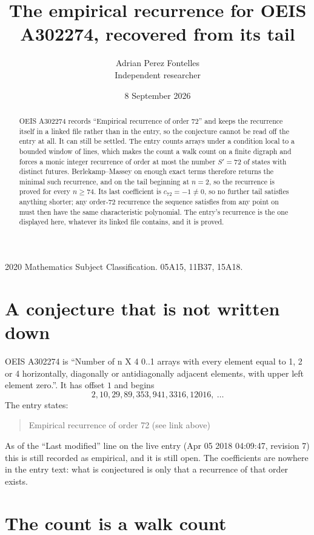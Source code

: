 \documentclass[11pt,a4paper]{article}
\title{The empirical recurrence for OEIS A302274, recovered from its tail}
\author{Adrian Perez Fontelles\\ \small Independent researcher}
\date{8 September 2026}
\theoremstyle{plain}
\theoremstyle{definition}
\begin{document}
\maketitle

\begin{abstract}
OEIS A302274 records ``Empirical recurrence of order $72$'' and keeps the recurrence itself in
a linked file rather than in the entry, so the conjecture cannot be read off the entry at all.
It can still be settled. The entry counts arrays under a condition local to a bounded window of
lines, which makes the count a walk count on a finite digraph and forces a monic integer
recurrence of order at most the number $S'=72$ of states with distinct futures. Berlekamp--Massey on
enough exact terms therefore returns the minimal such recurrence, and on the tail beginning at $n=2$, so the recurrence is proved for every $n\ge74$.
Its last coefficient is $c_{72}=-1\neq0$, so no further tail satisfies anything
shorter; any order-$72$ recurrence the sequence satisfies from any point on must then have
the same characteristic polynomial. The entry's recurrence is the one displayed here, whatever
its linked file contains, and it is proved.
\end{abstract}

\noindent\small 2020 Mathematics Subject Classification. 05A15, 11B37, 15A18.\normalsize

\section{A conjecture that is not written down}

OEIS A302274 is ``Number of n X 4 0..1 arrays with every element equal to 1, 2 or 4 horizontally, diagonally or antidiagonally adjacent elements, with upper left element zero.''. It has offset $1$ and begins
\[
2, 10, 29, 89, 353, 941, 3316, 12016,\ \dots
\]
The entry states:
\begin{quote}
Empirical recurrence of order 72 (see link above)
\end{quote}
As of the ``Last modified'' line on the live entry (Apr 05 2018 04:09:47, revision 7)
this is still recorded as empirical, and it is still open. The coefficients are nowhere in the
entry text: what is conjectured is only that a recurrence of that order exists.

\section{The count is a walk count}
\end{document}
